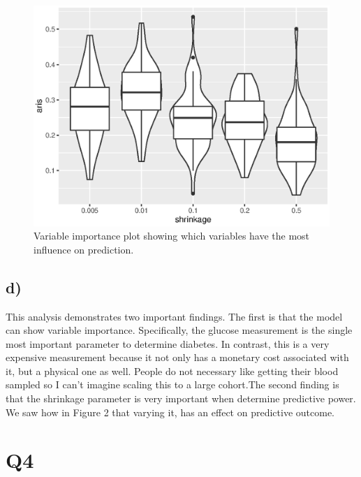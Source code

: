 \documentclass[12pt, centerh1]{article}
\begin{document}
\begin{figure}[!htb]
\caption{Variable importance plot showing which variables have the most influence on prediction.}
\centering
\includegraphics[scale=0.8]{compare_shrinkage}
\end{figure}


\subsection*{d)}
This analysis demonstrates two important findings. The first is that the model can show variable importance. Specifically, the glucose measurement is the single most important parameter to determine diabetes. In contrast, this is a very expensive measurement because it not only has a monetary cost associated with it, but a physical one as well. People do not necessary like getting their blood sampled so I can't imagine scaling this to a large cohort.The second finding is that the shrinkage parameter is very important when determine predictive power. We saw how in Figure 2 that varying it, has an effect on predictive outcome. 


\section*{Q4}
\end{document}
